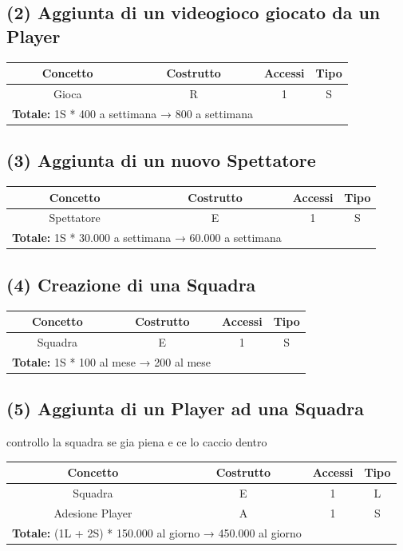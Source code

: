 \documentclass[a4paper,12pt]{report}
\begin{document}
\subsection*{(2) Aggiunta di un videogioco giocato da un Player}
\begin{center}
	\begin{tabular}{|c|c|c|c|}
		\hline\rowcolor{pink}
		Concetto & Costrutto & Accessi & Tipo\\
		\hline\hline
		Gioca & R & 1 & S\\
		\hline\hline
		\multicolumn{2}{l}{%
			\textbf{Totale:} 1S * 400 a settimana → 800 a settimana} \\
		\hline
	\end{tabular}
\end{center}
\subsection*{(3) Aggiunta di un nuovo Spettatore}
\begin{center}
	\begin{tabular}{|c|c|c|c|}
		\hline\rowcolor{pink}
		Concetto & Costrutto & Accessi & Tipo\\
		\hline\hline
		Spettatore & E & 1 & S\\
		\hline\hline
		\multicolumn{2}{l}{%
			\textbf{Totale:}  1S * 30.000 a settimana → 60.000 a settimana } \\
		\hline
	\end{tabular}
\end{center}
\subsection*{(4) Creazione di una Squadra}
\begin{center}
	\begin{tabular}{|c|c|c|c|}
		\hline\rowcolor{pink}
		Concetto & Costrutto & Accessi & Tipo\\
		\hline
		Squadra & E & 1 & S\\
		\hline\hline
		\multicolumn{2}{l}{%
			\textbf{Totale:} 1S * 100 al mese  → 200 al mese} \\
		\hline\hline
	\end{tabular}
\end{center}
\subsection*{(5) Aggiunta di un Player ad una Squadra}
controllo la squadra se gia piena e ce lo caccio dentro
\begin{center}
	\begin{tabular}{|c|c|c|c|}
		\hline\rowcolor{pink}
		Concetto & Costrutto & Accessi & Tipo\\
		\hline\hline		
		Squadra & E & 1 & L\\
		Adesione Player & A & 1 & S\\
		\hline
		\hline
		\multicolumn{2}{l}{%
			\textbf{Totale:} (1L + 2S) * 150.000 al giorno → 450.000 al giorno} \\
		\hline
	\end{tabular}
\end{center}
\end{document}
